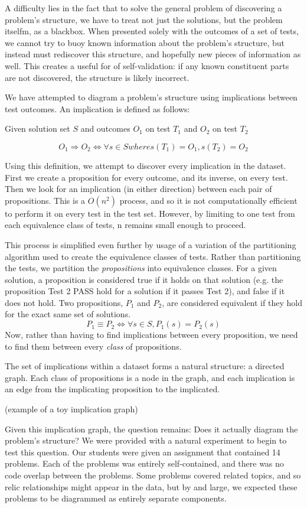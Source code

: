 \documentclass[11pt]{article}
\begin{document}
A difficulty lies in the fact that to solve the general problem of discovering a problem's structure, we have to treat not just the solutions, but the problem itselfm, as a blackbox. When presented solely with the outcomes of a set of tests, we cannot try to buoy known information about the problem's structure, but instead must rediscover this structure, and hopefully new pieces of information as well. This creates a useful for of self-validation: if any known constituent parts are not discovered, the structure is likely incorrect.

We have attempted to diagram a problem's structure using implications between test outcomes. An implication is defined as follows:

\centerline{Given solution set $S$ and outcomes $O_1$ on test $T_1$ and $O_2$ on test $T_2$}
$$O_1 \Rightarrow O_2 \iff \forall s \in S where s(T_1) = O_1, s(T_2) = O_2$$

Using this definition, we attempt to discover every implication in the dataset. First we create a proposition for every outcome, and its inverse, on every test. Then we look for an implication (in either direction) between each pair of propositions. This is a $O(n^2)$ process, and so it is not computationally efficient to perform it on every test in the test set. However, by limiting to one test from each equivalence class of tests, n remains small enough to proceed.

This process is simplified even further by usage of a variation of the partitioning algorithm used to create the equivalence classes of tests. Rather than partitioning the tests, we partition the \emph{propositions} into equivalence classes. For a given solution, a proposition is considered true if it holds on that solution (e.g. the proposition Test 2 PASS hold for a solution if it passes Test 2), and false if it does not hold. Two propositions, $P_1$ and $P_2$, are considered equivalent if they hold for the exact same set of solutions.
$$P_1 \equiv P_2 \iff \forall s \in S, P_1(s) = P_2(s)$$
Now, rather than having to find implications between every proposition, we need to find them between every \emph{class} of propositions.

The set of implications within a dataset forms a natural structure: a directed graph. Each class of propositions is a node in the graph, and each implication is an edge from the implicating proposition to the implicated.

(example of a toy implication graph)

Given this implication graph, the question remains: Does it actually diagram the problem's structure? We were provided with a natural experiment to begin to test this question. Our students were given an assignment that contained 14 problems. Each of the problems was entirely self-contained, and there was no code overlap between the problems. Some problems covered related topics, and so relic relationships might appear in the data, but by and large, we expected these problems to be diagrammed as entirely separate components.
\end{document}
